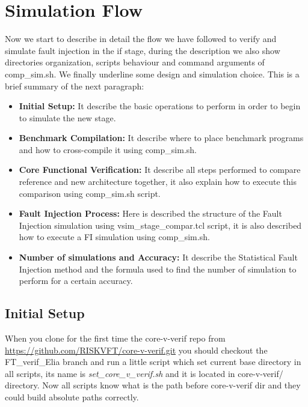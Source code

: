 {    \section{Simulation Flow}{
        Now we start to describe in detail the flow we have followed to verify and simulate fault injection in the if stage, during the description we also show directories organization, scripts behaviour and command arguments of comp\_sim.sh. We finally underline some design  and simulation choice. 
        This is a brief summary of the next paragraph:
        \begin{itemize}
            \item \textbf{Initial Setup:} It describe the basic operations to perform in order to begin to simulate the new stage.
            \item \textbf{Benchmark Compilation:} It describe where to place benchmark programs and how to cross-compile it using comp\_sim.sh.
            \item \textbf{Core Functional Verification:} It describe all steps performed to compare reference and new architecture together, it also explain how to execute this comparison using comp\_sim.sh script.
            \item \textbf{Fault Injection Process:} Here is described the structure of the Fault Injection simulation using vsim\_stage\_compar.tcl script, it is also described how to execute a FI simulation using comp\_sim.sh.
            \item \textbf{Number of simulations and Accuracy:} It describe the Statistical Fault Injection method and the formula used to find the number of simulation to perform for a certain accuracy.
        \end{itemize}
    
        \subsection{Initial Setup}{
            When you clone for the first time the core-v-verif repo from \url{https://github.com/RISKVFT/core-v-verif.git} you should checkout the FT\_verif\_Elia branch and run a little script which set current base directory in all scripts, its name is \textit{set\_core\_v\_verif.sh} and it is located in core-v-verif/ directory. Now all scripts know what is the path before core-v-verif dir and they could build absolute paths correctly.\\
            
}}}
